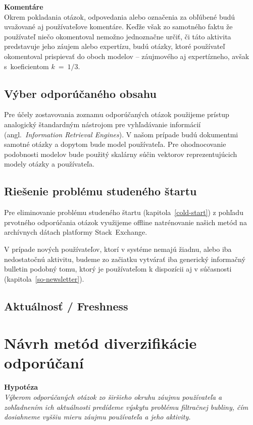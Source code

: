 \textbf{Komentáre}\\
Okrem pokladania otázok, odpovedania alebo označenia za obľúbené budú uvažované aj používateľove komentáre. Keďže však
zo samotného faktu že používateľ niečo okomentoval nemožno jednoznačne určiť, či táto aktivita predstavuje jeho záujem
alebo expertízu, budú otázky, ktoré používateľ okomentoval prispievať do oboch modelov -- záujmového aj expertízneho, avšak
s~koeficientom $k~=~1/3$.

\subsection{Výber odporúčaného obsahu}

Pre účely zostavovania zoznamu odporúčaných otázok použijeme prístup analogický štandardným nástrojom pre vyhľadávanie
informácií (angl.~\emph{Information Retrieval Engines}). V našom prípade budú dokumentmi samotné otázky a dopytom bude
model používateľa. Pre ohodnocovanie podobnosti modelov bude použitý skalárny súčin vektorov reprezentujúcich
modely otázky a používateľa.


\subsection{Riešenie problému studeného štartu}

Pre eliminovanie problému studeného štartu (kapitola~\ref{cold-start}) z pohľadu prvotného odporúčania otázok využijeme
offline natrénovanie našich metód na archívnych dátach platformy Stack~Exchange.

V prípade nových používateľov, ktorí v systéme nemajú žiadnu, alebo iba nedostatočnú aktivitu, budeme zo začiatku vytvárať
iba generický informačný bulletin podobný tomu, ktorý je používateľom k dispozícii aj v súčasnosti (kapitola~\ref{so-newsletter}).


\subsection{Aktuálnosť / Freshness}


\section{Návrh metód diverzifikácie odporúčaní}

\textbf{Hypotéza}\\
\textit{Výberom odporúčaných otázok zo širšieho okruhu záujmu používateľa a zohľadnením ich aktuálnosti predídeme výskytu problému
filtračnej bubliny, čím dosiahneme vyššiu mieru záujmu používateľa a jeho aktivity.}
